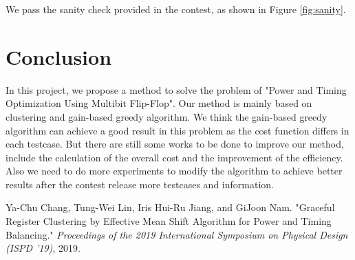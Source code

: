 \documentclass[12pt]{article}
\begin{document}
We pass the sanity check provided in the contest, as shown in Figure \ref{fig:sanity}.

\section{Conclusion}

In this project, we propose a method to solve the problem of "Power and Timing Optimization Using Multibit Flip-Flop". Our method is mainly based on clustering and gain-based greedy algorithm. We think the gain-based greedy algorithm can achieve a good result in this problem as the cost function differs in each testcase. But there are still some works to be done to improve our method, include the calculation of the overall cost and the improvement of the efficiency. Also we need to do more experiments to modify the algorithm to achieve better results after the contest release more testcases and information.

\begin{thebibliography}{9}
    Ya-Chu Chang, Tung-Wei Lin, Iris Hui-Ru Jiang, and GiJoon Nam. "Graceful Register Clustering by Effective Mean Shift Algorithm for Power and Timing Balancing." \textit{Proceedings of the 2019 International Symposium on Physical Design (ISPD '19)}, 2019.
\end{thebibliography}
\end{document}
